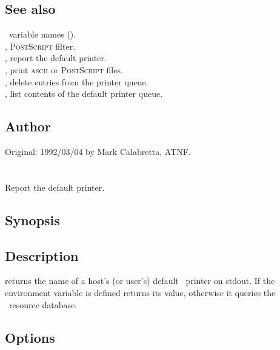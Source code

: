 \subsection*{See also}

\aipspp\ variable names ().\\
, \textsc{PostScript} filter.\\
, report the default printer.\\
, print \textsc{ascii} or \textsc{PostScript} files.\\
, delete entries from the printer queue.\\
, list contents of the default printer queue.

\subsection*{Author}

Original: 1992/03/04 by Mark Calabretta, ATNF.


\newpage
\section{}
\label{prd}

Report the default printer.

\subsection*{Synopsis}

\begin{synopsis}
\end{synopsis}

\subsection*{Description}

 returns the name of a host's (or user's) default \aipspp\ printer
on stdout.  If the  environment variable is defined 
returns its value, otherwise it queries the \aipspp\ resource database.

\subsection*{Options}

